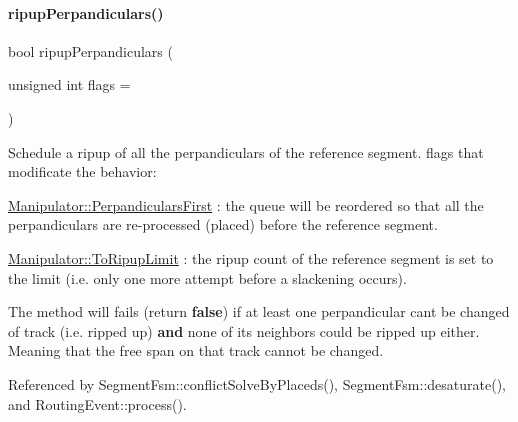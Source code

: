 \mbox{\label{classKite_1_1Manipulator_a147c24aa53f561c10d5d24b82b03448a}} 
\paragraph{\texorpdfstring{ripup\+Perpandiculars()}{ripupPerpandiculars()}}
{\footnotesize\ttfamily bool ripup\+Perpandiculars (\begin{DoxyParamCaption}\item[{unsigned int}]{flags = {} }\end{DoxyParamCaption})}

Schedule a ripup of all the perpandiculars of the reference segment. {\ttfamily flags} that modificate the behavior\+:
\begin{DoxyItemize}
\item \hyperlink{classKite_1_1Manipulator_a2af2ad6b6441614038caf59d04b3b217acdaeb48fa352f2898aa225b618ca26d4}{Manipulator\+::\+Perpandiculars\+First} \+: the queue will be reordered so that all the perpandiculars are re-\/processed (placed) before the reference segment.
\item \hyperlink{classKite_1_1Manipulator_a2af2ad6b6441614038caf59d04b3b217a6c00c46010d69247a3edc18b70d700fa}{Manipulator\+::\+To\+Ripup\+Limit} \+: the ripup count of the reference segment is set to the limit (i.\+e. only one more attempt before a slackening occurs).
\end{DoxyItemize}

The method will fails (return {\bfseries false}) if at least one perpandicular can\textquotesingle{}t be changed of track (i.\+e. ripped up) {\bfseries and} none of it\textquotesingle{}s neighbors could be ripped up either. Meaning that the free span on that track cannot be changed. 

Referenced by Segment\+Fsm\+::conflict\+Solve\+By\+Placeds(), Segment\+Fsm\+::desaturate(), and Routing\+Event\+::process().

\mbox{\label{classKite_1_1Manipulator_a9721ea909a9b11297dea855e1ba82a55}} 
